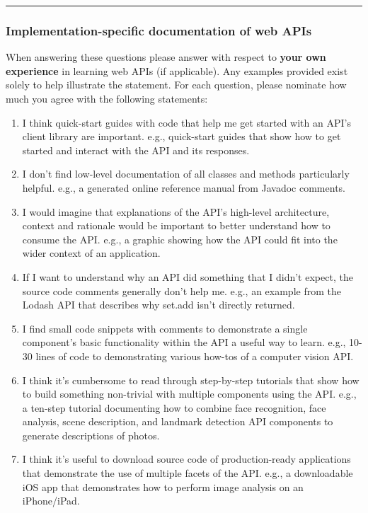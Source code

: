 \bigskip\hrule

\subsubsection*{Implementation-specific documentation of web APIs}\noindent
When answering these questions please answer with respect to \textbf{your own experience} in learning web APIs (if applicable). Any examples provided exist solely to help illustrate the statement. For each question, please nominate how much you agree with the following statements: \AgreementScale

\begin{enumerate}[label=Q3\alph*.,leftmargin=2\parindent]
\item I think quick-start guides with code that help me get started with an API’s client library are important.
 e.g., quick-start guides that show how to get started and interact with the API and its responses.
\item I don't find low-level documentation of all classes and methods particularly helpful.
 e.g., a generated online reference manual from Javadoc comments.  
\item I would imagine that explanations of the API's high-level architecture, context and rationale would be important to better understand how to consume the API.
  e.g., a graphic showing how the API could fit into the wider context of an application.  
\item If I want to understand why an API did something that I didn't expect, the source code comments generally don't help me.
  e.g., an example from the Lodash API that describes why set.add isn't directly returned.  
\item I find small code snippets with comments to demonstrate a single component's basic functionality within the API a useful way to learn.
  e.g., 10-30 lines of code to demonstrating various how-tos of a computer vision API.  
\item  I think it's cumbersome to read through step-by-step tutorials that show how to build something non-trivial with multiple components using the API. 
   e.g., a ten-step tutorial documenting how to combine face recognition, face analysis, scene description, and landmark detection API components to generate descriptions of photos.   
\item  I think it's useful to download source code of production-ready applications that demonstrate the use of multiple facets of the API. 
   e.g., a downloadable iOS app that demonstrates how to perform image analysis on an iPhone/iPad.

\end{enumerate}
